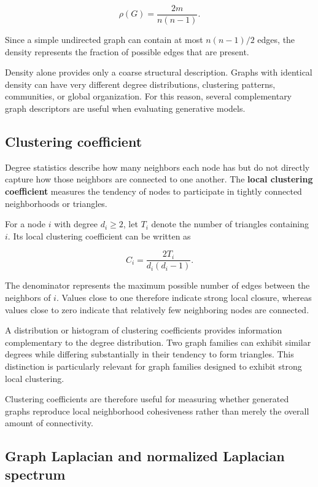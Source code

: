 \[
\rho(G)=\frac{2m}{n(n-1)}.
\]

Since a simple undirected graph can contain at most \(n(n-1)/2\) edges, the density represents the fraction of possible edges that are present.

Density alone provides only a coarse structural description. Graphs with identical density can have very different degree distributions, clustering patterns, communities, or global organization. For this reason, several complementary graph descriptors are useful when evaluating generative models.


\subsection{Clustering coefficient}
\label{subsec:clustering_coefficient}

Degree statistics describe how many neighbors each node has but do not directly capture how those neighbors are connected to one another. The \textbf{local clustering coefficient} measures the tendency of nodes to participate in tightly connected neighborhoods or triangles.

For a node \(i\) with degree \(d_i\geq 2\), let \(T_i\) denote the number of triangles containing \(i\). Its local clustering coefficient can be written as

\[
C_i=\frac{2T_i}{d_i(d_i-1)}.
\]

The denominator represents the maximum possible number of edges between the neighbors of \(i\). Values close to one therefore indicate strong local closure, whereas values close to zero indicate that relatively few neighboring nodes are connected.

A distribution or histogram of clustering coefficients provides information complementary to the degree distribution. Two graph families can exhibit similar degrees while differing substantially in their tendency to form triangles. This distinction is particularly relevant for graph families designed to exhibit strong local clustering.

Clustering coefficients are therefore useful for measuring whether generated graphs reproduce local neighborhood cohesiveness rather than merely the overall amount of connectivity.


\subsection{Graph Laplacian and normalized Laplacian spectrum}
\label{subsec:laplacian_spectrum}

